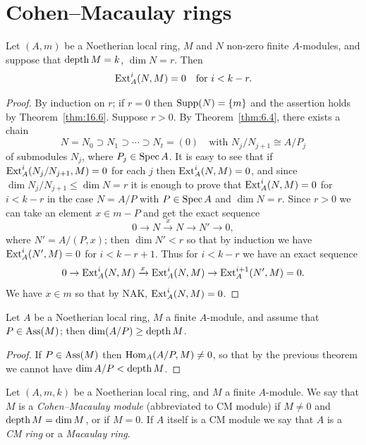 \section{Cohen--Macaulay rings}\label{sec:17}

\begin{theorem}[Ischebeck]\label{thm:17.1}
Let $(A, m)$ be a Noetherian local ring, $M$ and $N$
non-zero finite $A$-modules, and suppose that $\operatorname{depth} M = k$, $\dim N = r$. Then
\[
  \operatorname{Ext}^i_A(N, M) = 0 \quad \text{for } i < k - r.
\]
\end{theorem}

\begin{proof}
By induction on $r$; if $r = 0$ then $\operatorname{Supp}(N) = \{m\}$ and the assertion
holds by Theorem~\ref{thm:16.6}. Suppose $r > 0$. By Theorem~\ref{thm:6.4}, there exists a
chain
\[
  N = N_0 \supset N_1 \supset \cdots \supset N_t = (0) \quad \text{with } N_j/N_{j+1} \cong A/P_j
\]
of submodules $N_j$, where $P_j \in \operatorname{Spec} A$. It is easy to see that if $\operatorname{Ext}^i_A
(N_j/N_{j+1}, M) = 0$ for each $j$ then $\operatorname{Ext}^i_A(N, M) = 0$, and since $\dim N_j/N_{j+1} \le
\dim N = r$ it is enough to prove that $\operatorname{Ext}^i_A(N, M) = 0$ for $i < k - r$ in the
case $N = A/P$ with $P \in \operatorname{Spec} A$ and $\dim N = r$. Since $r > 0$ we can take
an element $x \in m - P$ and get the exact sequence
\[
  0 \to N \xrightarrow{x} N \to N' \to 0,
\]
where $N' = A/(P, x)$; then $\dim N' < r$ so that by induction we have
$\operatorname{Ext}^i_A(N', M) = 0$ for $i < k - r + 1$. Thus for $i < k - r$ we have an exact
sequence
\[
  0 \to \operatorname{Ext}^i_A(N, M) \xrightarrow{x} \operatorname{Ext}^i_A(N, M) \to \operatorname{Ext}^{i+1}_A(N', M) = 0.
\]
We have $x \in m$ so that by NAK, $\operatorname{Ext}^i_A(N, M) = 0$.
\end{proof}

\begin{theorem}\label{thm:17.2}
Let $A$ be a Noetherian local ring, $M$ a finite $A$-module,
and assume that $P \in \operatorname{Ass}(M)$; then $\dim(A/P) \ge \operatorname{depth} M$.
\end{theorem}

\begin{proof}
If $P \in \operatorname{Ass}(M)$ then $\operatorname{Hom}_A(A/P, M) \neq 0$, so that by the previous
theorem we cannot have $\dim A/P < \operatorname{depth} M$.
\end{proof}

\begin{definition}
Let $(A, m, k)$ be a Noetherian local ring, and $M$ a finite
$A$-module. We say that $M$ is a \emph{Cohen--Macaulay module} (abbreviated to
CM module) if $M \neq 0$ and $\operatorname{depth} M = \dim M$, or if $M = 0$. If $A$ itself is a
CM module we say that $A$ is a \emph{CM ring} or a \emph{Macaulay ring}.
\end{definition}

